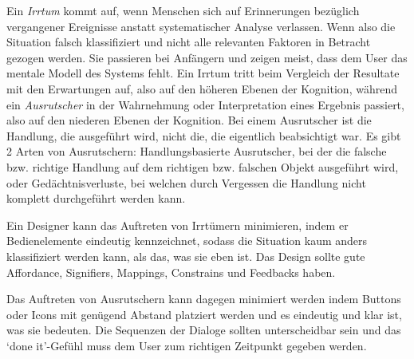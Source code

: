 Ein \textit{Irrtum} kommt auf, wenn Menschen sich auf Erinnerungen 
bezüglich vergangener Ereignisse anstatt systematischer Analyse 
verlassen. Wenn also die Situation falsch klassifiziert und nicht 
alle relevanten Faktoren in Betracht gezogen werden. Sie passieren 
bei Anfängern und zeigen meist, dass dem User das mentale Modell 
des Systems fehlt. Ein Irrtum tritt beim Vergleich der Resultate 
mit den Erwartungen auf, also auf den höheren Ebenen der Kognition, 
während ein \textit{Ausrutscher} in der Wahrnehmung oder 
Interpretation eines Ergebnis passiert, also auf den niederen 
Ebenen der Kognition. Bei einem Ausrutscher ist die Handlung, 
die ausgeführt wird, nicht die, die eigentlich beabsichtigt war. 
Es gibt 2 Arten von Ausrutschern: Handlungsbasierte Ausrutscher, 
bei der die falsche bzw. richtige Handlung auf dem richtigen bzw. 
falschen Objekt ausgeführt wird, oder Gedächtnisverluste, bei 
welchen durch Vergessen die Handlung nicht komplett durchgeführt 
werden kann.


Ein Designer kann das Auftreten von Irrtümern minimieren, 
indem er Bedienelemente eindeutig kennzeichnet, sodass die 
Situation kaum anders klassifiziert werden kann, als das, was 
sie eben ist. Das Design sollte gute Affordance, Signifiers, 
Mappings, Constrains und Feedbacks haben.


Das Auftreten von Ausrutschern kann dagegen minimiert werden 
indem Buttons oder Icons mit genügend Abstand platziert werden 
und es eindeutig und klar ist, was sie bedeuten. Die Sequenzen 
der Dialoge sollten unterscheidbar sein und das ‘done it’-Gefühl 
muss dem User zum richtigen Zeitpunkt gegeben werden.
